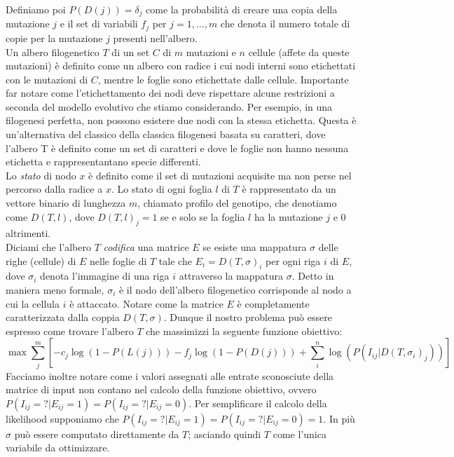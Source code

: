 \documentclass{report}
\begin{document}
  Definiamo poi $P(D(j))={\delta}_{j}$ come la probabilità di creare una copia della mutazione $j$ e il set di variabili ${f}_{j}$ per $j=1,...,m$ che denota il numero totale di copie per la mutazione $j$ presenti nell'albero.\\
  Un albero filogenetico $T$ di un set $C$ di $m$ mutazioni e $n$ cellule (affete da queste mutazioni) è definito come un albero con radice i cui nodi interni sono etichettati con le mutazioni di $C$, mentre le foglie sono etichettate dalle cellule. Importante far notare come l'etichettamento dei nodi deve rispettare alcune restrizioni a seconda del modello evolutivo che stiamo considerando. Per esempio, in una filogenesi perfetta, non possono esistere due nodi con la stessa etichetta.
  Questa è un'alternativa del classico della classica filogenesi basata su caratteri, dove l'albero T è definito come un set di caratteri e dove le foglie non hanno nessuna etichetta e rappresentantano specie differenti.\\
  Lo \emph{stato} di nodo $x$ è definito come il set di mutazioni acquisite ma non perse nel percorso dalla radice a $x$. Lo stato di ogni foglia $l$ di $T$ è rappresentato da un vettore binario di lunghezza $m$, chiamato profilo del genotipo, che denotiamo come $D(T, l)$, dove $D{(T, l)}_{j}=1$ se e solo se la foglia $l$ ha la mutazione $j$ e 0 altrimenti.\\
  Diciami che l'albero $T$ \emph{codifica} una matrice $E$ se esiste una mappatura $\sigma$ delle righe (cellule) di $E$ nelle foglie di $T$ tale che $E_{i}=D(T, \sigma)_{i}$ per ogni riga $i$ di $E$, dove ${\sigma}_{i}$ denota l'immagine di una riga $i$ attraverso la mappatura $\sigma$.
  Detto in maniera meno formale, ${\sigma}_{i}$ è il nodo dell'albero filogenetico corrisponde al nodo a cui la cellula $i$ è attaccato. Notare come la matrice $E$ è completamente caratterizzata dalla coppia $D(T, \sigma)$. Dunque il nostro problema può essere espresso come trovare l'albero $T$ che massimizzi la seguente funzione obiettivo:
  \[
    \max{\sum_{j}^{m}[-c_{j}\log(1-P(L(j)))-f_{j}\log(1-P(D(j)))+\sum_{i}^{n}\log(P(I_{ij}|D(T, \sigma_{i})_{j}))]}
  \]
  Facciamo inoltre notare come i valori assegnati alle entrate sconosciute della matrice di input non contano nel calcolo della funzione obiettivo, ovvero $P(I_{ij}=?|E_{ij}=1)=P(I_{ij}=?|E_{ij}=0)$. Per semplificare il calcolo della likelihood supponiamo che $P(I_{ij}=?|E_{ij}=1)=P(I_{ij}=?|E_{ij}=0)=1$.
  In più $\sigma$ può essere computato direttamente da $T$; asciando quindi $T$ come l'unica variabile da ottimizzare.
\end{document}
